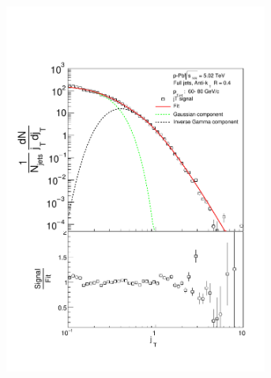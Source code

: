 \begin{appendices}
\begin{figure}
\begin{subfigure}{0.24\textwidth}
\includegraphics[width=0.95\textwidth]{results/JetConejTSignalFit/JetConejTSignalFitNFin00JetPt05perconeBgBayes}
\end{subfigure}
\begin{subfigure}{0.24\textwidth}

\end{subfigure}
\end{figure}
\end{appendices}
